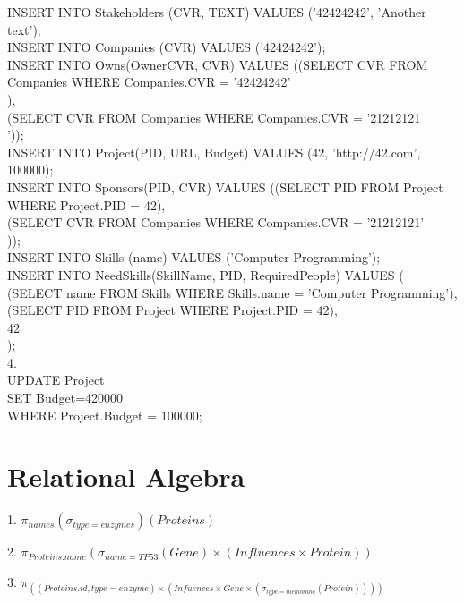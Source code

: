\documentclass[12pt]{article}
\begin{document}
{INSERT INTO Stakeholders (CVR, TEXT) VALUES ('42424242', 'Another text');\\

INSERT INTO Companies (CVR) VALUES ('42424242');\\

INSERT INTO Owns(OwnerCVR, CVR) VALUES ((SELECT CVR FROM Companies WHERE 
Companies.CVR = '42424242'\\),\\
                                         (SELECT CVR FROM Companies WHERE Companies.CVR = '21212121\\'));\\

INSERT INTO Project(PID, URL, Budget) VALUES (42, 'http://42.com', 100000);\\

INSERT INTO Sponsors(PID, CVR) VALUES ((SELECT PID FROM Project WHERE Project.PID = 42),\\
                                      (SELECT CVR FROM Companies WHERE Companies.CVR = '21212121'\\));\\


INSERT INTO Skills (name) VALUES ('Computer Programming');\\

INSERT INTO NeedSkills(SkillName, PID, RequiredPeople) VALUES (\\
  (SELECT name FROM Skills WHERE Skills.name = 'Computer Programming'),\\
  (SELECT PID FROM Project WHERE Project.PID = 42),\\
  42\\
);\\

4.\\

UPDATE Project\\
SET Budget=420000\\
WHERE Project.Budget = 100000;\\

\section{Relational Algebra}

1. $\pi_{names}(\sigma_{type=enzymes})(Proteins) $

2. $\pi_{Proteins.name}( \sigma_{name = TP53}(Gene) \times (Influences \times Protein) )$

3. $\pi_{ ( ( Proteins.id, type=enzyme )  \times (Infuences \times Gene \times (\sigma_{ type=membrane}(Protein))) ) }$

}
\end{document}

